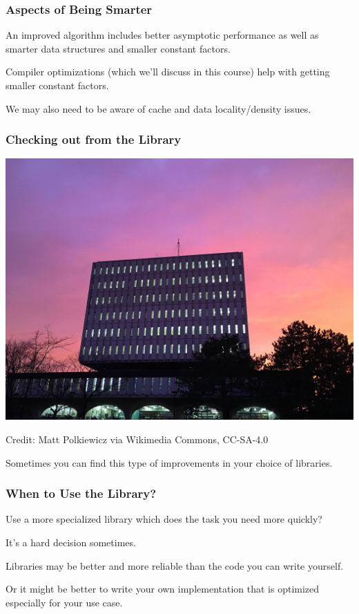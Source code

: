 \begin{frame}
\frametitle{Aspects of Being Smarter}
\Large

An improved algorithm includes better asymptotic performance
as well as smarter data structures and smaller constant factors.


Compiler optimizations (which we'll discuss in this course) help with
getting smaller constant factors. 

We may also need to be aware of cache
and data locality/density issues.

\end{frame}



\begin{frame}
\frametitle{Checking out from the Library}
\Large
\begin{changemargin}{-1cm}
\begin{center}
\includegraphics[width=.8\textwidth]{images/L01-Dana-Porter.jpg}
\end{center}
\end{changemargin}
{\hfill \small
Credit: Matt Polkiewicz via Wikimedia Commons, CC-SA-4.0}

Sometimes you can find this type of improvements in your choice of
libraries.

\end{frame}

\begin{frame}
\frametitle{When to Use the Library?}
\Large

Use a more specialized library which does the
task you need more quickly?
 
It's a hard decision sometimes. 

Libraries may be better and more reliable than the code you can write yourself. 

Or it might be better to write your own implementation that is optimized especially for your use case.

\end{frame}



